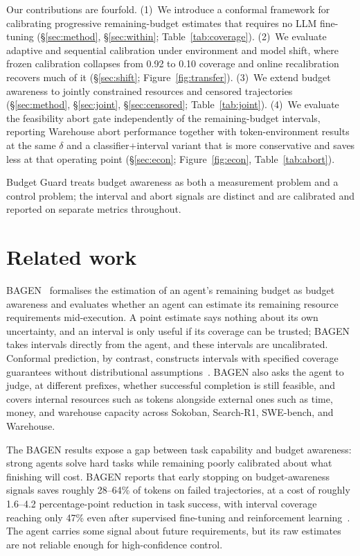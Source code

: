 \documentclass{article}
\begin{document}
Our contributions are fourfold. (1)~We introduce a conformal framework for calibrating progressive remaining-budget estimates that requires no LLM fine-tuning (\S\ref{sec:method}, \S\ref{sec:within}; Table~\ref{tab:coverage}). (2)~We evaluate adaptive and sequential calibration under environment and model shift, where frozen calibration collapses from 0.92 to 0.10 coverage and online recalibration recovers much of it (\S\ref{sec:shift}; Figure~\ref{fig:transfer}). (3)~We extend budget awareness to jointly constrained resources and censored trajectories (\S\ref{sec:method}, \S\ref{sec:joint}, \S\ref{sec:censored}; Table~\ref{tab:joint}). (4)~We evaluate the feasibility abort gate independently of the remaining-budget intervals, reporting Warehouse abort performance together with token-environment results at the same $\delta$ and a classifier+interval variant that is more conservative and saves less at that operating point (\S\ref{sec:econ}; Figure~\ref{fig:econ}, Table~\ref{tab:abort}).

Budget Guard treats budget awareness as both a measurement problem and a control problem; the interval and abort signals are distinct and are calibrated and reported on separate metrics throughout.

\section{Related work}
\label{sec:related}

BAGEN~\cite{lin2026bagen} formalises the estimation of an agent's remaining budget as budget awareness and evaluates whether an agent can estimate its remaining resource requirements mid-execution. A point estimate says nothing about its own uncertainty, and an interval is only useful if its coverage can be trusted; BAGEN takes intervals directly from the agent, and these intervals are uncalibrated. Conformal prediction, by contrast, constructs intervals with specified coverage guarantees without distributional assumptions~\cite{angelopoulos2023gentle,lei2018distribution}. BAGEN also asks the agent to judge, at different prefixes, whether successful completion is still feasible, and covers internal resources such as tokens alongside external ones such as time, money, and warehouse capacity across Sokoban, Search-R1, SWE-bench, and Warehouse.

The BAGEN results expose a gap between task capability and budget awareness: strong agents solve hard tasks while remaining poorly calibrated about what finishing will cost. BAGEN reports that early stopping on budget-awareness signals saves roughly 28--64\% of tokens on failed trajectories, at a cost of roughly 1.6--4.2 percentage-point reduction in task success, with interval coverage reaching only 47\% even after supervised fine-tuning and reinforcement learning~\cite{lin2026bagen}. The agent carries some signal about future requirements, but its raw estimates are not reliable enough for high-confidence control.
\end{document}
